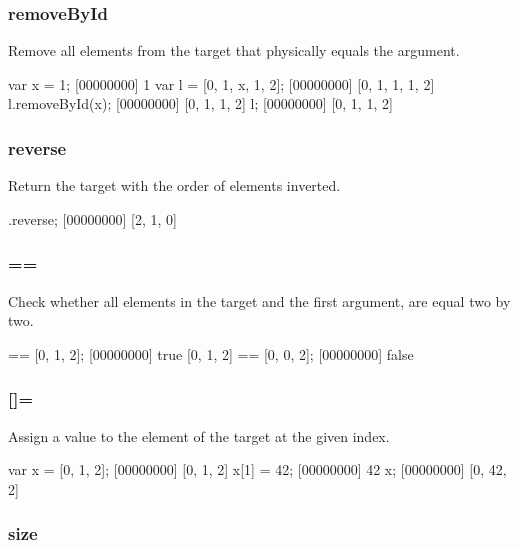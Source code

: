 \subsubsection{removeById}

Remove all elements from the target that physically equals the
argument.

\begin{urbiscript}
var x = 1;
[00000000] 1
var l = [0, 1, x, 1, 2];
[00000000] [0, 1, 1, 1, 2]
l.removeById(x);
[00000000] [0, 1, 1, 2]
l;
[00000000] [0, 1, 1, 2]
\end{urbiscript}

\subsubsection{reverse}

Return the target with the order of elements inverted.

\begin{urbiscript}
[0, 1, 2].reverse;
[00000000] [2, 1, 0]
\end{urbiscript}

\subsubsection{==}

Check whether all elements in the target and the first argument, are
equal two by two.

\begin{urbiscript}
[0, 1, 2] == [0, 1, 2];
[00000000] true
[0, 1, 2] == [0, 0, 2];
[00000000] false
\end{urbiscript}

\subsubsection{[]=}
\label{sec:std-list-setnth}

Assign a value to the element of the target at the given index.

\begin{urbiscript}
var x = [0, 1, 2];
[00000000] [0, 1, 2]
x[1] = 42;
[00000000] 42
x;
[00000000] [0, 42, 2]
\end{urbiscript}

\subsubsection{size}

